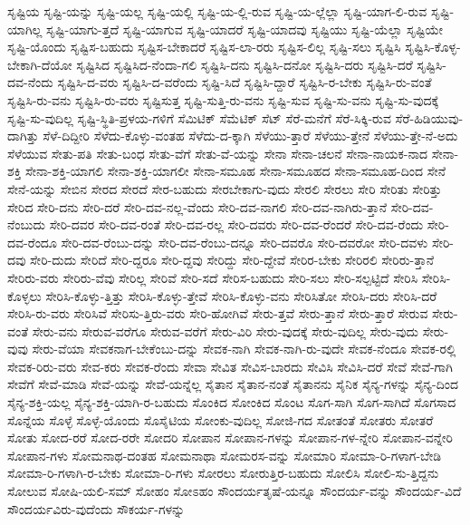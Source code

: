 {ಸೃಷ್ಟಿಯ
ಸೃಷ್ಟಿ-ಯನ್ನು
ಸೃಷ್ಟಿ-ಯಲ್ಲ
ಸೃಷ್ಟಿ-ಯಲ್ಲಿ
ಸೃಷ್ಟಿ-ಯ-ಲ್ಲಿ-ರುವ
ಸೃಷ್ಟಿ-ಯ-ಲ್ಲೆಲ್ಲಾ
ಸೃಷ್ಟಿ-ಯಾಗ-ಲಿ-ರುವ
ಸೃಷ್ಟಿ-ಯಾಗಿಲ್ಲ
ಸೃಷ್ಟಿ-ಯಾಗು-ತ್ತದೆ
ಸೃಷ್ಟಿ-ಯಾಗುವ
ಸೃಷ್ಟಿ-ಯಾದರೆ
ಸೃಷ್ಟಿ-ಯಾದವು
ಸೃಷ್ಟಿಯು
ಸೃಷ್ಟಿ-ಯೆಲ್ಲಾ
ಸೃಷ್ಟಿಯೇ
ಸೃಷ್ಟಿ-ಯೊಂದು
ಸೃಷ್ಟಿಸ-ಬಹುದು
ಸೃಷ್ಟಿಸ-ಬೇಕಾದರೆ
ಸೃಷ್ಟಿಸ-ಲಾ-ರರು
ಸೃಷ್ಟಿಸ-ಲಿಲ್ಲ
ಸೃಷ್ಟಿ-ಸಲು
ಸೃಷ್ಟಿಸಿ
ಸೃಷ್ಟಿಸಿ-ಕೊಳ್ಳ-ಬೇಕಾಗಿ-ದೆಯೋ
ಸೃಷ್ಟಿಸಿದ
ಸೃಷ್ಟಿಸಿದ-ನೆಂದಾ-ಗಲಿ
ಸೃಷ್ಟಿಸಿ-ದನು
ಸೃಷ್ಟಿಸಿ-ದನೋ
ಸೃಷ್ಟಿಸಿ-ದರು
ಸೃಷ್ಟಿಸಿ-ದರೆ
ಸೃಷ್ಟಿಸಿ-ದವ-ನೆಂದು
ಸೃಷ್ಟಿಸಿ-ದ-ವರು
ಸೃಷ್ಟಿಸಿ-ದ-ವರೆಂದು
ಸೃಷ್ಟಿ-ಸಿದೆ
ಸೃಷ್ಟಿಸಿ-ದ್ದಾರೆ
ಸೃಷ್ಟಿಸಿ-ರ-ಬೇಕು
ಸೃಷ್ಟಿಸಿ-ರು-ವಂತೆ
ಸೃಷ್ಟಿಸಿ-ರು-ವನು
ಸೃಷ್ಟಿಸಿ-ರು-ವರು
ಸೃಷ್ಟಿಸುತ್ತ
ಸೃಷ್ಟಿ-ಸುತ್ತಿ-ರು-ವನು
ಸೃಷ್ಟಿ-ಸುವ
ಸೃಷ್ಟಿ-ಸು-ವನು
ಸೃಷ್ಟಿ-ಸು-ವುದಕ್ಕೆ
ಸೃಷ್ಟಿ-ಸು-ವುದಿಲ್ಲ
ಸೃಷ್ಟಿ-ಸ್ಥಿತಿ-ಪ್ರಳಯ-ಗಳಿಗೆ
ಸೆಮಿಟಿಕ್
ಸೆಮೆಟಿಕ್
ಸೆಟ್
ಸೆರೆ-ಮನೆಗೆ
ಸೆರೆ-ಸಿಕ್ಕಿ-ರುವ
ಸೆರೆ-ಹಿಡಿಯುವು-ದಾಗಿತ್ತು
ಸೆಳೆ-ದಿದ್ದೀರಿ
ಸೆಳೆದು-ಕೊಳ್ಳು-ವಂತಹ
ಸೆಳೆದು-ದ-ಕ್ಕಾಗಿ
ಸೆಳೆಯು-ತ್ತಾರೆ
ಸೆಳೆಯು-ತ್ತೇನೆ
ಸೆಳೆಯು-ತ್ತೇ-ನೆ-ಅದು
ಸೆಳೆಯುವ
ಸೇತು-ಪತಿ
ಸೇತು-ಬಂಧ
ಸೇತು-ವೆಗೆ
ಸೇತು-ವೆ-ಯನ್ನು
ಸೇನಾ
ಸೇನಾ-ಚಲನೆ
ಸೇನಾ-ನಾಯಕ-ನಾದ
ಸೇನಾ-ಶಕ್ತಿ
ಸೇನಾ-ಶಕ್ತಿ-ಯಾಗಲಿ
ಸೇನಾ-ಶಕ್ತಿ-ಯಾಗಲೀ
ಸೇನಾ-ಸಮೂಹ
ಸೇನಾ-ಸಮೂಹದ
ಸೇನಾ-ಸಮೂಹ-ದಿಂದ
ಸೇನೆ
ಸೇನೆ-ಯನ್ನು
ಸೇಬಿನ
ಸೇರದ
ಸೇರದೆ
ಸೇರ-ಬಹುದು
ಸೇರಬೇಕಾಗು-ವುದು
ಸೇರಲಿ
ಸೇರಲು
ಸೇರಿ
ಸೇರಿತು
ಸೇರಿತ್ತು
ಸೇರಿದ
ಸೇರಿ-ದನು
ಸೇರಿ-ದರೆ
ಸೇರಿ-ದವ-ನಲ್ಲ-ವೆಂದು
ಸೇರಿ-ದವ-ನಾಗಲಿ
ಸೇರಿ-ದವ-ನಾಗಿರು-ತ್ತಾನೆ
ಸೇರಿ-ದವ-ನೆಂಬುದು
ಸೇರಿ-ದವರ
ಸೇರಿ-ದವ-ರಂತೆ
ಸೇರಿ-ದವ-ರಲ್ಲ
ಸೇರಿ-ದವರು
ಸೇರಿ-ದವ-ರೆಂದರೆ
ಸೇರಿ-ದವ-ರೆಂದು
ಸೇರಿ-ದವ-ರೆಂದೂ
ಸೇರಿ-ದವ-ರೆಂಬು-ದನ್ನು
ಸೇರಿ-ದವ-ರೆಂಬು-ದನ್ನೂ
ಸೇರಿ-ದವರೊ
ಸೇರಿ-ದವರೋ
ಸೇರಿ-ದವಳು
ಸೇರಿ-ದವು
ಸೇರಿ-ದುದು
ಸೇರಿದೆ
ಸೇರಿ-ದ್ದರೂ
ಸೇರಿ-ದ್ದವು
ಸೇರಿದ್ದು
ಸೇರಿ-ದ್ದೇವೆ
ಸೇರಿರ-ಬೇಕು
ಸೇರಿರಲಿ
ಸೇರಿರು-ತ್ತಾನೆ
ಸೇರಿರು-ವರು
ಸೇರಿರು-ವೆವು
ಸೇರಿಲ್ಲ
ಸೇರಿವೆ
ಸೇರಿ-ಸದೆ
ಸೇರಿಸ-ಬಹುದು
ಸೇರಿ-ಸಲು
ಸೇರಿ-ಸಲ್ಪಟ್ಟಿದೆ
ಸೇರಿಸಿ
ಸೇರಿಸಿ-ಕೊಳ್ಳಲು
ಸೇರಿಸಿ-ಕೊಳ್ಳು-ತ್ತಿತ್ತು
ಸೇರಿಸಿ-ಕೊಳ್ಳು-ತ್ತೇವೆ
ಸೇರಿಸಿ-ಕೊಳ್ಳು-ವನು
ಸೇರಿಸಿತೋ
ಸೇರಿಸಿ-ದರು
ಸೇರಿಸಿ-ದರೆ
ಸೇರಿಸಿ-ರು-ವರು
ಸೇರಿಸಿವೆ
ಸೇರಿಸು-ತ್ತಿರು-ವರು
ಸೇರಿ-ಹೋಗಿವೆ
ಸೇರು-ತ್ತವೆ
ಸೇರು-ತ್ತಾನೆ
ಸೇರು-ತ್ತಾರೆ
ಸೇರುವ
ಸೇರು-ವಂತೆ
ಸೇರು-ವನು
ಸೇರುವ-ವರೆಗೂ
ಸೇರುವ-ವರೆಗೆ
ಸೇರು-ವಿರಿ
ಸೇರು-ವುದಕ್ಕೆ
ಸೇರು-ವುದಿಲ್ಲ
ಸೇರು-ವುದು
ಸೇರು-ವುವು
ಸೇರು-ವೆಯಾ
ಸೇವಕನಾಗ-ಬೇಕೆಂಬು-ದನ್ನು
ಸೇವಕ-ನಾಗಿ
ಸೇವಕ-ನಾಗಿ-ರು-ವುದೇ
ಸೇವಕ-ನೆಂದೂ
ಸೇವಕ-ರಲ್ಲಿ
ಸೇವಕ-ರಿರು-ವರು
ಸೇವ-ಕರು
ಸೇವಕ-ರೆಂದು
ಸೇವಾ
ಸೇವಿತ
ಸೇವಿಸ-ಬಾರದು
ಸೇವಿಸಿ
ಸೇವಿಸಿ-ದರೆ
ಸೇವೆ
ಸೇವೆ-ಗಾಗಿ
ಸೇವೆಗೆ
ಸೇವೆ-ಮಾಡಿ
ಸೇವೆ-ಯನ್ನು
ಸೇವೆ-ಯನ್ನೆಲ್ಲ
ಸೈತಾನ
ಸೈತಾನ-ನಂತೆ
ಸೈತಾನನು
ಸೈನಿಕ
ಸೈನ್ಯ-ಗಳನ್ನು
ಸೈನ್ಯ-ದಿಂದ
ಸೈನ್ಯ-ಶಕ್ತಿ-ಯಲ್ಲ
ಸೈನ್ಯ-ಶಕ್ತಿ-ಯಾಗಿ-ರ-ಬಹುದು
ಸೊಂಕಿದ
ಸೋಂಕಿದ
ಸೊಂಟ
ಸೊಗ-ಸಾಗಿ
ಸೊಗ-ಸಾಗಿದೆ
ಸೊಗಸಾದ
ಸೊನ್ನೆಯ
ಸೊಳ್ಳೆ
ಸೊಳ್ಳೆ-ಯೊಂದು
ಸೊಸೈಟಿಯ
ಸೋಂಕು-ವುದಿಲ್ಲ
ಸೋಜಿ-ಗದ
ಸೋತಂತೆ
ಸೋತರು
ಸೋತರೆ
ಸೋತು
ಸೋದ-ರರೆ
ಸೋದ-ರರೇ
ಸೋದರಿ
ಸೋಪಾನ
ಸೋಪಾನ-ಗಳನ್ನು
ಸೋಪಾನ-ಗಳ-ನ್ನೇರಿ
ಸೋಪಾನ-ವನ್ನೇರಿ
ಸೋಪಾನ-ಗಳು
ಸೋಮನಾಥ-ದಂತಹ
ಸೋಮನಾಥಾ
ಸೋಮರಸ-ವನ್ನು
ಸೋಮಾರಿ
ಸೋಮಾ-ರಿ-ಗಳಾಗ-ಬೇಡಿ
ಸೋಮಾ-ರಿ-ಗಳಾಗಿ-ರ-ಬೇಕು
ಸೋಮಾ-ರಿ-ಗಳು
ಸೋರಲು
ಸೋರುತ್ತಿರ-ಬಹುದು
ಸೋಲಿಸಿ
ಸೋಲಿ-ಸು-ತ್ತಿದ್ದನು
ಸೋಲುವ
ಸೋಷಿ-ಯಲಿ-ಸಮ್
ಸೋಹಂ
ಸೋಽಹಂ
ಸೌಂದರ್ಯತೃಷೆ-ಯನ್ನೂ
ಸೌಂದರ್ಯ-ವನ್ನು
ಸೌಂದರ್ಯ-ವಿದೆ
ಸೌಂದರ್ಯವಿರು-ವುದೆಂದು
ಸೌಕರ್ಯ-ಗಳನ್ನು
}
